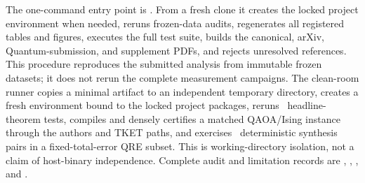 The one-command entry point is
.  From a fresh clone it creates the
locked project environment when needed, reruns frozen-data audits, regenerates
all registered tables and figures, executes the full test suite, builds the
canonical, arXiv, Quantum-submission, and supplement PDFs, and rejects
unresolved references.  This procedure reproduces the submitted analysis from
immutable frozen datasets; it does not rerun the complete measurement
campaigns.  The clean-room runner
copies a minimal artifact to an independent temporary directory, creates a
fresh environment bound to the locked project packages, reruns
\CleanTheoryTests\ headline-theorem tests, compiles and densely certifies a
matched QAOA/Ising instance through the authors and TKET paths, and exercises
\CleanGridPairs\ deterministic synthesis pairs in a fixed-total-error QRE
subset.  This is working-directory isolation, not a claim of host-binary
independence.  Complete audit and limitation records are
, ,
, and .
